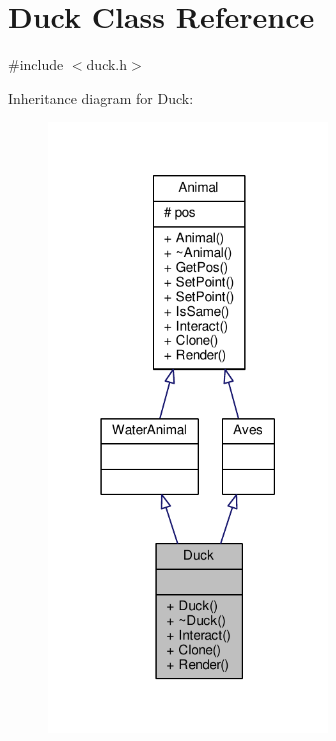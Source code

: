 \hypertarget{classDuck}{}\section{Duck Class Reference}
\label{classDuck}


{\ttfamily \#include $<$duck.\+h$>$}



Inheritance diagram for Duck\+:
\nopagebreak
\begin{figure}[H]
\begin{center}
\leavevmode
\includegraphics[width=210pt]{classDuck__inherit__graph}
\end{center}
\end{figure}


